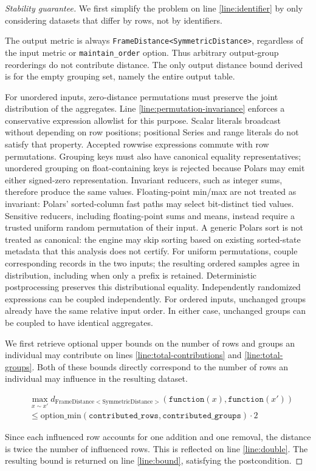 \documentclass{article}
\begin{document}
\begin{proof}[Stability guarantee]
    We first simplify the problem on line \ref{line:identifier} by only considering datasets that differ by rows, not by identifiers.

    The output metric is always \texttt{FrameDistance<SymmetricDistance>},
    regardless of the input metric or \texttt{maintain\_order} option.
    Thus arbitrary output-group reorderings do not contribute distance.
    The only output distance bound derived is for the empty grouping set, namely the entire output table.

    For unordered inputs, zero-distance permutations must preserve the joint
    distribution of the aggregates. Line \ref{line:permutation-invariance}
    enforces a conservative expression allowlist for this purpose.
    Scalar literals broadcast without depending on row positions; positional
    Series and range literals do not satisfy that property.
    Accepted rowwise expressions commute with row permutations.
    Grouping keys must also have canonical equality representatives; unordered
    grouping on float-containing keys is rejected because Polars may emit either
    signed-zero representation. Invariant reducers, such as integer sums, therefore
    produce the same values. Floating-point min/max are not treated as invariant:
    Polars' sorted-column fast paths may select bit-distinct tied values.
    Sensitive reducers, including floating-point sums and means, instead require
    a trusted uniform random permutation of their input. A generic Polars sort
    is not treated as canonical: the engine may skip sorting based on existing
    sorted-state metadata that this analysis does not certify.
    For uniform permutations, couple corresponding records in the two inputs;
    the resulting ordered samples agree in distribution, including when only a
    prefix is retained. Deterministic postprocessing preserves this distributional
    equality. Independently randomized expressions can be coupled independently.
    For ordered inputs, unchanged groups already have the same relative input order.
    In either case, unchanged groups can be coupled to have identical aggregates.

    We first retrieve optional upper bounds on the number of rows and groups an individual may contribute on lines \ref{line:total-contributions} and \ref{line:total-groups}.
    Both of these bounds directly correspond to the number of rows an individual may influence in the resulting dataset.

    \begin{align}
        &\max_{x \sim x'} d_{\mathrm{FrameDistance<SymmetricDistance>}}(\texttt{function}(x), \texttt{function}(x')) \\
        &\le \mathrm{option\_min}(\texttt{contributed\_rows}, \texttt{contributed\_groups}) \cdot 2
    \end{align}

    Since each influenced row accounts for one addition and one removal, the distance is twice the number of influenced rows.
    This is reflected on line \ref{line:double}.
    The resulting bound is returned on line \ref{line:bound}, satisfying the postcondition.
\end{proof}
\end{document}
